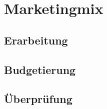 \section{Marketingmix}
\label{sec:mix}

\subsection{Erarbeitung}

\subsection{Budgetierung}

\subsection{Überprüfung}

